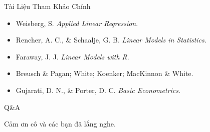 \documentclass[aspectratio=169,professionalfonts]{beamer}
\begin{document}
\begin{frame}{Tài Liệu Tham Khảo Chính}
  \small
  \begin{itemize}
    \item Weisberg, S. \textit{Applied Linear Regression}.
    \item Rencher, A. C., \& Schaalje, G. B. \textit{Linear Models in Statistics}.
    \item Faraway, J. J. \textit{Linear Models with R}.
    \item Breusch \& Pagan; White; Koenker; MacKinnon \& White.
    \item Gujarati, D. N., \& Porter, D. C. \textit{Basic Econometrics}.
  \end{itemize}
\end{frame}

\begin{frame}
  \centering
  \Huge Q\&A

  \vspace{0.5cm}
  \large Cảm ơn cô và các bạn đã lắng nghe.
\end{frame}
\end{document}
